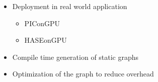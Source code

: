 \begin{itemize}
\item Deployment in real world application
  \begin{itemize}
  \item PIConGPU
  \item HASEonGPU
  \end{itemize}

\item Compile time generation of static graphs

\item Optimization of the graph to reduce overhead

\end{itemize}

\cleardoublepage

